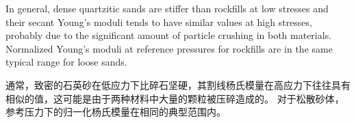 \begin{ParaColumn}
    \switchcolumn*

    In general, dense quartzitic sands are stiffer than rockfills at low stresses and their secant Young’s moduli tends to have similar values at high stresses, probably due to the significant amount of particle crushing in both materials. Normalized Young’s moduli at reference pressures for rockfills are in the same typical range for loose sands.

    \switchcolumn

    通常，致密的石英砂在低应力下比碎石坚硬，其割线杨氏模量在高应力下往往具有相似的值，这可能是由于两种材料中大量的颗粒被压碎造成的。 对于松散砂体，参考压力下的归一化杨氏模量在相同的典型范围内。

\end{ParaColumn}